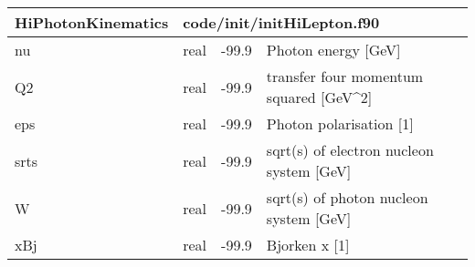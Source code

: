 \documentclass{article}
\begin{document}
\begin{longtable}{llll}
\toprule
\textbf{\large{HiPhotonKinematics}} & \multicolumn{3}{l}{\footnotesize{code/init/initHiLepton.f90}}\\*
\midrule
\endfirsthead
\midrule
\endhead
nu & \begin{minipage}[t]{2cm}real\end{minipage} & \begin{minipage}[t]{2cm}-99.9\end{minipage} & \begin{minipage}[t]{12cm}Photon energy [GeV]\end{minipage}\\*
\midrule
Q2 & \begin{minipage}[t]{2cm}real\end{minipage} & \begin{minipage}[t]{2cm}-99.9\end{minipage} & \begin{minipage}[t]{12cm}transfer four momentum squared [GeV\^{}2]\end{minipage}\\*
\midrule
eps & \begin{minipage}[t]{2cm}real\end{minipage} & \begin{minipage}[t]{2cm}-99.9\end{minipage} & \begin{minipage}[t]{12cm}Photon polarisation [1]\end{minipage}\\*
\midrule
srts & \begin{minipage}[t]{2cm}real\end{minipage} & \begin{minipage}[t]{2cm}-99.9\end{minipage} & \begin{minipage}[t]{12cm}sqrt(s) of electron nucleon system [GeV]\end{minipage}\\*
\midrule
W & \begin{minipage}[t]{2cm}real\end{minipage} & \begin{minipage}[t]{2cm}-99.9\end{minipage} & \begin{minipage}[t]{12cm}sqrt(s) of photon nucleon system [GeV]\end{minipage}\\*
\midrule
xBj & \begin{minipage}[t]{2cm}real\end{minipage} & \begin{minipage}[t]{2cm}-99.9\end{minipage} & \begin{minipage}[t]{12cm}Bjorken x [1]\end{minipage}\\*

\end{longtable}
\end{document}
